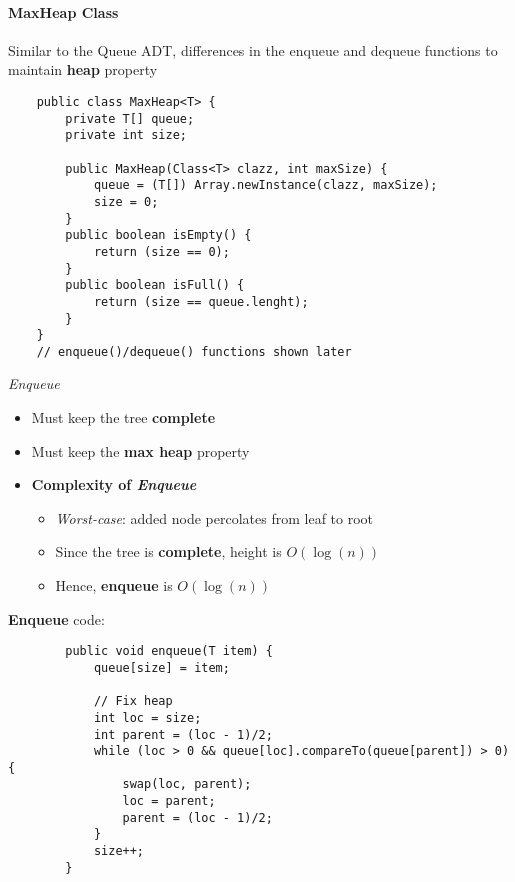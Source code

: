 \documentclass[10pt, 
a4paper, 
oneside, 
headinclude, footinclude, 
BCOR5mm]
{scrartcl}
\begin{document}
\paragraph{\textbf{MaxHeap Class}}
Similar to the Queue ADT, differences in the enqueue and dequeue functions to maintain \textbf{heap} property
\begin{lstlisting}
    public class MaxHeap<T> {
        private T[] queue;
        private int size;

        public MaxHeap(Class<T> clazz, int maxSize) {
            queue = (T[]) Array.newInstance(clazz, maxSize);
            size = 0;
        }
        public boolean isEmpty() {
            return (size == 0);
        }
        public boolean isFull() {
            return (size == queue.lenght);
        }
    }
    // enqueue()/dequeue() functions shown later
\end{lstlisting}
\begin{definition}
    \textit{Enqueue}
    \begin{itemize}
        \item Must keep the tree \textbf{complete}
        \item Must keep the \textbf{max heap} property
        \item \textbf{Complexity of \textit{Enqueue}}
        \begin{itemize}
            \item \textit{Worst-case}: added node percolates from leaf to root
            \item Since the tree is \textbf{complete}, height is $O(\log(n))$
            \item Hence, \textbf{enqueue} is $O(\log(n))$
        \end{itemize}
    \end{itemize}
    \newpage
    \textbf{Enqueue} code:
    \begin{lstlisting}
        public void enqueue(T item) {
            queue[size] = item;

            // Fix heap
            int loc = size;
            int parent = (loc - 1)/2;
            while (loc > 0 && queue[loc].compareTo(queue[parent]) > 0) {
                swap(loc, parent);
                loc = parent;
                parent = (loc - 1)/2;
            }
            size++;
        }

    \end{lstlisting}
\end{definition}


\newpage
\end{document}
